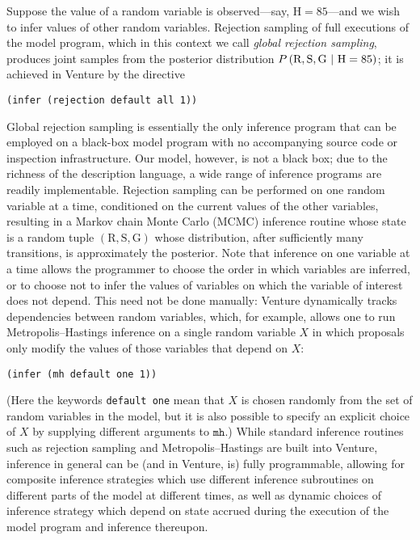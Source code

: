 Suppose the value of a random variable is observed---say, $\text{H} = 85$---and
we wish to infer values of other random variables.  Rejection sampling of full
executions of the model program, which in this context we call \emph{global
rejection sampling}, produces joint samples from the posterior distribution
$P\left( \text{R}, \text{S}, \text{G} \ \middle\vert\  \text{H}=85 \right)$; it is achieved in
Venture by the directive
\begin{lstlisting}
(infer (rejection default all 1))
\end{lstlisting}
Global rejection sampling is essentially the only inference program that
can be employed on a black-box model program with no accompanying source
code or inspection infrastructure.  Our model, however, is not a black box;
due to the richness of the description language, a wide range of inference
programs are readily implementable.  Rejection sampling can be performed on
one random variable at a time, conditioned on the current values of the
other variables, resulting in a Markov chain Monte Carlo (MCMC) inference
routine whose state is a random tuple $(\text{R}, \text{S}, \text{G})$
whose distribution, after sufficiently many transitions, is approximately
the posterior.
Note that inference on one variable at a time allows the programmer to
choose the order in which variables are inferred, or to choose not to infer
the values of variables on which the variable of interest does not depend.
This need not be done manually: Venture dynamically tracks dependencies between
random variables, which, for example, allows one to run Metropolis--Hastings
inference on a single random variable $X$ in which proposals only modify the
values of those variables that depend on $X$:
\begin{lstlisting}
(infer (mh default one 1))
\end{lstlisting}
(Here the keywords \texttt{default one} mean that $X$ is chosen randomly from
the set of random variables in the model, but it is also possible to specify an
explicit choice of $X$ by supplying different arguments to $\texttt{mh}$.)
While standard inference routines such as rejection sampling and
Metropolis--Hastings are built into Venture, inference in general can be (and in
Venture, is) fully programmable, allowing for composite inference strategies
which use different inference subroutines on different parts of the model at
different times, as well as dynamic choices of inference strategy which depend
on state accrued during the execution of the model program and inference
thereupon.

